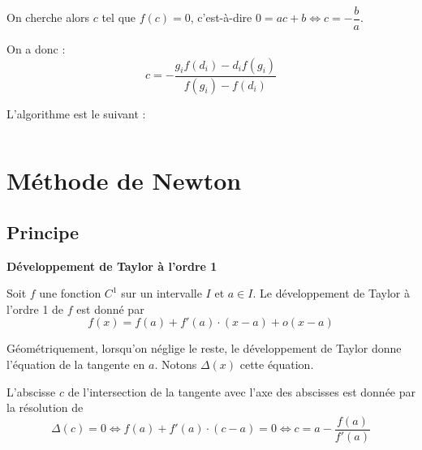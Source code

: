 \documentclass[10pt]{article}
\begin{document}
On cherche alors  $c$ tel que $f(c)=0$, c'est-à-dire $0=ac+b \Longleftrightarrow c = -\dfrac{b}{a}$.

On a donc : 
$$
c = -\dfrac{g_i f(d_i) -d_if(g_i) }{f(g_i)  - f(d_i) }
$$



\begin{pseudo}
L'algorithme est le suivant :

\begin{algorithm}[H]
\end{algorithm}
\end{pseudo}

\else
$$ \quad $$
\vspace{12cm}
\newpage

\fi

\section{Méthode de Newton}

\subsection{Principe}
\begin{theo}
\textbf{Développement de Taylor à l'ordre 1}

Soit $f$ une fonction $C^1$ sur un intervalle $I$ et $a\in I$. Le développement de Taylor à l'ordre 1 de $f$ est donné par 
$$
f(x)=f(a)+ f'(a)\cdot(x-a)+\mathit{o}(x-a)
$$
\end{theo}

Géométriquement, lorsqu'on néglige le reste, le développement de Taylor donne l'équation de la tangente en $a$. Notons $\Delta(x)$ cette équation.

L'abscisse $c$ de l'intersection de la tangente avec l'axe des abscisses est donnée par la résolution de 
$$
\Delta(c)=0 
\Longleftrightarrow f(a)+ f'(a)\cdot(c-a) = 0
\Longleftrightarrow c = a-\dfrac{f(a)}{f'(a)}
$$
\end{document}
